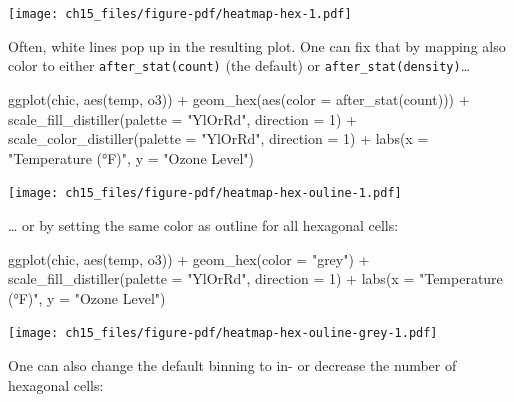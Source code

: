 \documentclass[
  letterpaper,
]{scrbook}
\newenvironment{Shaded}{\begin{snugshade}}{\end{snugshade}}
\newcommand{\AttributeTok}[1]{\textcolor[rgb]{0.40,0.45,0.13}{#1}}
\newcommand{\DecValTok}[1]{\textcolor[rgb]{0.68,0.00,0.00}{#1}}
\newcommand{\FunctionTok}[1]{\textcolor[rgb]{0.28,0.35,0.67}{#1}}
\newcommand{\NormalTok}[1]{\textcolor[rgb]{0.00,0.23,0.31}{#1}}
\newcommand{\SpecialCharTok}[1]{\textcolor[rgb]{0.37,0.37,0.37}{#1}}
\newcommand{\StringTok}[1]{\textcolor[rgb]{0.13,0.47,0.30}{#1}}
\begin{document}
\texttt{[image: ch15\_files/figure-pdf/heatmap-hex-1.pdf]}

Often, white lines pop up in the resulting plot. One can fix that by
mapping also color to either \texttt{after\_stat(count)} (the default)
or \texttt{after\_stat(density)}\ldots{}

\begin{Shaded}
\begin{Highlighting}[]
\FunctionTok{ggplot}\NormalTok{(chic, }\FunctionTok{aes}\NormalTok{(temp, o3)) }\SpecialCharTok{+}
  \FunctionTok{geom\_hex}\NormalTok{(}\FunctionTok{aes}\NormalTok{(}\AttributeTok{color =} \FunctionTok{after\_stat}\NormalTok{(count))) }\SpecialCharTok{+}
  \FunctionTok{scale\_fill\_distiller}\NormalTok{(}\AttributeTok{palette =} \StringTok{"YlOrRd"}\NormalTok{, }\AttributeTok{direction =} \DecValTok{1}\NormalTok{) }\SpecialCharTok{+}
  \FunctionTok{scale\_color\_distiller}\NormalTok{(}\AttributeTok{palette =} \StringTok{"YlOrRd"}\NormalTok{, }\AttributeTok{direction =} \DecValTok{1}\NormalTok{) }\SpecialCharTok{+}
  \FunctionTok{labs}\NormalTok{(}\AttributeTok{x =} \StringTok{"Temperature (°F)"}\NormalTok{, }\AttributeTok{y =} \StringTok{"Ozone Level"}\NormalTok{)}
\end{Highlighting}
\end{Shaded}

\texttt{[image: ch15\_files/figure-pdf/heatmap-hex-ouline-1.pdf]}

\ldots{} or by setting the same color as outline for all hexagonal
cells:

\begin{Shaded}
\begin{Highlighting}[]
\FunctionTok{ggplot}\NormalTok{(chic, }\FunctionTok{aes}\NormalTok{(temp, o3)) }\SpecialCharTok{+}
  \FunctionTok{geom\_hex}\NormalTok{(}\AttributeTok{color =} \StringTok{"grey"}\NormalTok{) }\SpecialCharTok{+}
  \FunctionTok{scale\_fill\_distiller}\NormalTok{(}\AttributeTok{palette =} \StringTok{"YlOrRd"}\NormalTok{, }\AttributeTok{direction =} \DecValTok{1}\NormalTok{) }\SpecialCharTok{+}
  \FunctionTok{labs}\NormalTok{(}\AttributeTok{x =} \StringTok{"Temperature (°F)"}\NormalTok{, }\AttributeTok{y =} \StringTok{"Ozone Level"}\NormalTok{)}
\end{Highlighting}
\end{Shaded}

\texttt{[image: ch15\_files/figure-pdf/heatmap-hex-ouline-grey-1.pdf]}

One can also change the default binning to in- or decrease the number of
hexagonal cells:
\end{document}

